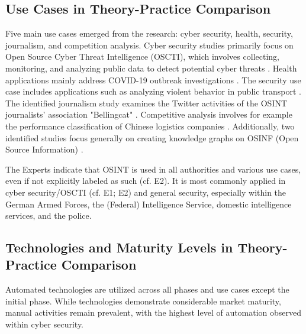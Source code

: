 \documentclass[10pt]{article}
\begin{document}
\subsection{Use Cases in Theory-Practice Comparison}

Five main use cases emerged from the research: cyber security, health, security, journalism,
and competition analysis. Cyber security studies primarily focus on Open Source Cyber Threat
Intelligence (OSCTI), which involves collecting, monitoring, and analyzing public
data to detect potential cyber threats \cite{Ahuja.2022,AlDmour.2023}.
Health applications mainly address COVID-19 outbreak investigations \cite{Kpozehouen.2020}.
The security use case includes applications such as
analyzing violent behavior in public transport \cite{Nobili.2021}. The identified journalism study examines the
Twitter activities of the OSINT journalists' association "Bellingcat" \cite{Bar.2023}. Competitive analysis
involves for example the performance classification of Chinese logistics companies \cite{Tao.2023}.
Additionally, two identified studies focus generally on creating knowledge graphs on OSINF (Open Source Information) \cite{Hu.2023, Ma.2022}.

The Experts indicate that OSINT is used in all authorities and various use cases, even if not explicitly labeled as such (cf. E2). It is most commonly applied in cyber security/OSCTI (cf. E1; E2) and general security, especially within the German Armed Forces, the (Federal) Intelligence Service, domestic intelligence services, and the police.

\subsection{Technologies and Maturity Levels in Theory-Practice Comparison}

Automated technologies are utilized across all phases and use cases except the initial phase.
While technologies demonstrate considerable market maturity, manual activities remain prevalent, with the highest level of automation observed within cyber security.
\end{document}
